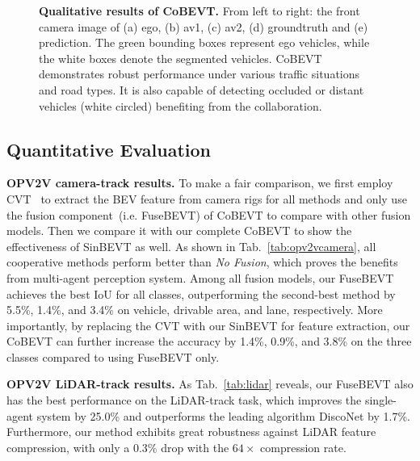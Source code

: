 \documentclass{article}
\begin{document}
{\begin{figure}[!t]
\begin{subfigure}[c]{0.19\linewidth}
        \label{fig:output-e}
    \end{subfigure}
    \vspace{-2mm}
    \caption{\textbf{Qualitative results of CoBEVT.} From left to right: the front camera image of (a) ego, (b) av1, (c) av2, (d) groundtruth and (e) prediction. The green bounding boxes represent ego vehicles, while the white boxes denote the segmented vehicles. CoBEVT demonstrates robust performance under various traffic situations and road types. It is also capable of detecting occluded or distant vehicles (white circled) benefiting from the collaboration.}
    \label{fig:qualitive}
    \vspace{-2mm}
\end{figure}

\subsection{Quantitative Evaluation}
\noindent\textbf{OPV2V camera-track results.} To make a fair comparison, we first employ CVT~\cite{zhou2022cross} to extract the BEV feature from camera rigs for all methods and only use the fusion component~(i.e. FuseBEVT) of CoBEVT to compare with other fusion models. Then we compare it with our complete CoBEVT to show the effectiveness of SinBEVT as well. As shown in  Tab.~\ref{tab:opv2vcamera}, all cooperative methods perform better than \textit{No Fusion}, which proves the benefits from multi-agent perception system. Among all fusion models, our FuseBEVT achieves the best IoU for all classes, outperforming the second-best method by 5.5\%, 1.4\%, and 3.4\% on vehicle, drivable area, and lane, respectively. More importantly, by replacing the CVT with our SinBEVT for feature extraction, our CoBEVT can further increase the accuracy by 1.4\%, 0.9\%, and 3.8\% on the three classes compared to using FuseBEVT only. 


\noindent\textbf{OPV2V LiDAR-track results.} As Tab.~\ref{tab:lidar} reveals, our FuseBEVT also has the best performance on the LiDAR-track task, which improves the single-agent system by 25.0\% and outperforms the leading algorithm DiscoNet by 1.7\%. Furthermore, our method exhibits great robustness against LiDAR feature compression, with only a 0.3\% drop with the $64\times$ compression rate.

}
\end{document}
